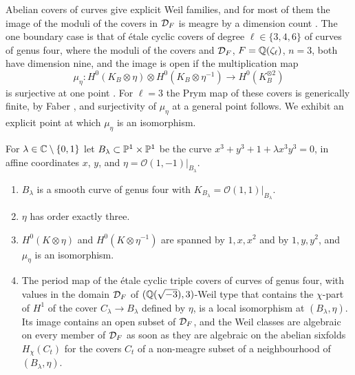 Abelian covers of curves give explicit Weil families, and for most of them the image of the moduli of the covers in $\mathcal{D}_{F}$ is meagre by a dimension count \cite[Prop.~23.13(iii)]{BMB26}. The one boundary case is that of \'etale cyclic covers of degree $\ell\in\{3,4,6\}$ of curves of genus four, where the moduli of the covers and $\mathcal{D}_{F}$, $F=\mathbb{Q}(\zeta_{\ell})$, $n=3$, both have dimension nine, and the image is open if the multiplication map
\begin{equation}\label{eq:multmap}
\mu_{\eta}\colon H^{0}(K_{B}\otimes\eta)\otimes H^{0}(K_{B}\otimes\eta^{-1})\longrightarrow H^{0}(K_{B}^{\otimes2})
\end{equation}
is surjective at one point \cite[Prop.~23.13(iv)]{BMB26}. For $\ell=3$ the Prym map of these covers is generically finite, by Faber \cite{Fab88}, and surjectivity of $\mu_{\eta}$ at a general point follows. We exhibit an explicit point at which $\mu_{\eta}$ is an isomorphism.

\begin{proposition}\label{prop:genusfour}
For $\lambda\in\mathbb{C}\setminus\{0,1\}$ let $B_{\lambda}\subset\mathbb{P}^{1}\times\mathbb{P}^{1}$ be the curve $x^{3}+y^{3}+1+\lambda x^{3}y^{3}=0$, in affine coordinates $x$, $y$, and $\eta=\mathcal{O}(1,-1)|_{B_{\lambda}}$.
\begin{enumerate}[label=\textup{(\roman*)},leftmargin=2.4em,itemsep=2pt]
\item $B_{\lambda}$ is a smooth curve of genus four with $K_{B_{\lambda}}=\mathcal{O}(1,1)|_{B_{\lambda}}$.
\item $\eta$ has order exactly three.
\item $H^{0}(K\otimes\eta)$ and $H^{0}(K\otimes\eta^{-1})$ are spanned by $1,x,x^{2}$ and by $1,y,y^{2}$, and $\mu_{\eta}$ is an isomorphism.
\item The period map of the \'etale cyclic triple covers of curves of genus four, with values in the domain $\mathcal{D}_{F}$ of $(\mathbb{Q}(\sqrt{-3}),3)$-Weil type that contains the $\chi$-part of $H^{1}$ of the cover $C_{\lambda}\to B_{\lambda}$ defined by $\eta$, is a local isomorphism at $(B_{\lambda},\eta)$. Its image contains an open subset of $\mathcal{D}_{F}$, and the Weil classes are algebraic on every member of $\mathcal{D}_{F}$ as soon as they are algebraic on the abelian sixfolds $H_{\chi}(C_{t})$ for the covers $C_{t}$ of a non-meagre subset of a neighbourhood of $(B_{\lambda},\eta)$.
\end{enumerate}
\end{proposition}

